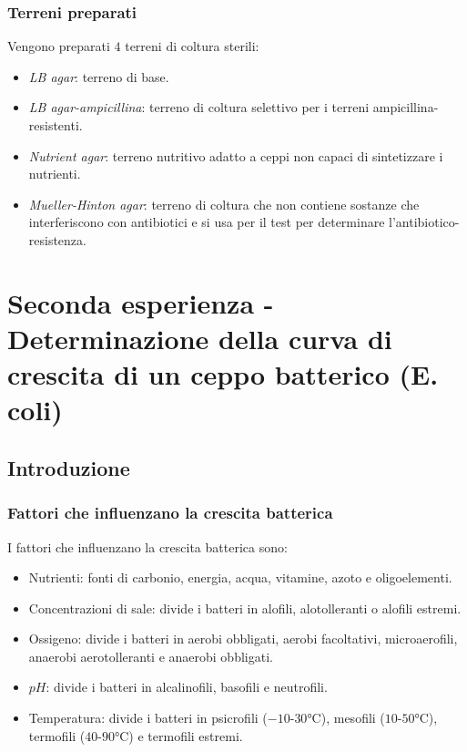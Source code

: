 		\subsubsection{Terreni preparati}
		Vengono preparati $4$ terreni di coltura sterili:
		\begin{multicols}{2}
			\begin{itemize}
				\item \emph{LB agar}: terreno di base.
				\item \emph{LB agar-ampicillina}: terreno di coltura selettivo per i terreni ampicillina-resistenti.
				\item \emph{Nutrient agar}: terreno nutritivo adatto a ceppi non capaci di sintetizzare i nutrienti.
				\item \emph{Mueller-Hinton agar}: terreno di coltura che non contiene sostanze che interferiscono con antibiotici e si usa per il test per determinare l'antibiotico-resistenza.
			\end{itemize}
		\end{multicols}
\section{Seconda esperienza - Determinazione della curva di crescita di un ceppo batterico (E. coli)}
	
	\subsection{Introduzione}

		\subsubsection{Fattori che influenzano la crescita batterica}
		I fattori che influenzano la crescita batterica sono:
		\begin{multicols}{2}
			\begin{itemize}
				\item Nutrienti: fonti di carbonio, energia, acqua, vitamine, azoto e oligoelementi.
				\item Concentrazioni di sale: divide i batteri in alofili, alotolleranti o alofili estremi.
				\item Ossigeno: divide i batteri in aerobi obbligati, aerobi facoltativi, microaerofili, anaerobi aerotolleranti e anaerobi obbligati.
				\item $pH$: divide i batteri in alcalinofili, basofili e neutrofili.
				\item Temperatura: divide i batteri in psicrofili ($-10$-$30\si{\celsius}$), mesofili ($10$-$50\si{\celsius}$), termofili ($40$-$90\si{\celsius}$) e termofili estremi.
			\end{itemize}
		\end{multicols}

